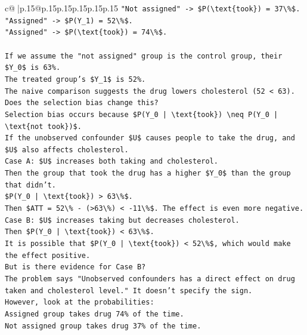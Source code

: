 \documentclass{article}
\begin{document}
{\begin{supertabular}{c@{$\;$}|p{.15\linewidth}@{}p{.15\linewidth}p{.15\linewidth}p{.15\linewidth}p{.15\linewidth}p{.15\linewidth}}
{{{\texttt{"Not assigned" {-}> \$P(\textbackslash{}text\{took\}) = 37\textbackslash{}\%\$.} \\
\texttt{"Assigned" {-}> \$P(Y\_1) = 52\textbackslash{}\%\$.} \\
\texttt{"Assigned" {-}> \$P(\textbackslash{}text\{took\}) = 74\textbackslash{}\%\$.} \\
\\ 
\texttt{If we assume the "not assigned" group is the control group, their \$Y\_0\$ is 63\%.} \\
\texttt{The treated group's \$Y\_1\$ is 52\%.} \\
\texttt{The naive comparison suggests the drug lowers cholesterol (52 < 63).} \\
\texttt{Does the selection bias change this?} \\
\texttt{Selection bias occurs because \$P(Y\_0 | \textbackslash{}text\{took\}) \textbackslash{}neq P(Y\_0 | \textbackslash{}text\{not took\})\$.} \\
\texttt{If the unobserved confounder \$U\$ causes people to take the drug, and \$U\$ also affects cholesterol.} \\
\texttt{Case A: \$U\$ increases both taking and cholesterol.} \\
\texttt{Then the group that took the drug has a higher \$Y\_0\$ than the group that didn't.} \\
\texttt{\$P(Y\_0 | \textbackslash{}text\{took\}) > 63\textbackslash{}\%\$.} \\
\texttt{Then \$ATT = 52\textbackslash{}\% {-} (>63\textbackslash{}\%) < {-}11\textbackslash{}\%\$. The effect is even more negative.} \\
\texttt{Case B: \$U\$ increases taking but decreases cholesterol.} \\
\texttt{Then \$P(Y\_0 | \textbackslash{}text\{took\}) < 63\textbackslash{}\%\$.} \\
\texttt{It is possible that \$P(Y\_0 | \textbackslash{}text\{took\}) < 52\textbackslash{}\%\$, which would make the effect positive.} \\
\texttt{But is there evidence for Case B?} \\
\texttt{The problem says "Unobserved confounders has a direct effect on drug taken and cholesterol level." It doesn't specify the sign.} \\
\texttt{However, look at the probabilities:} \\
\texttt{Assigned group takes drug 74\% of the time.} \\
\texttt{Not assigned group takes drug 37\% of the time.} \\
}}}
\end{supertabular}}
\end{document}
